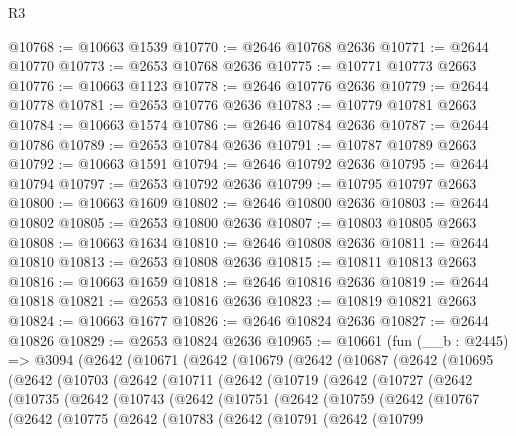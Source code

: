 \begin{lexlean}{R3}
\begin{coremodule}
@10768 := @10663 @1539
@10770 := @2646 @10768 @2636
@10771 := @2644 @10770
@10773 := @2653 @10768 @2636
@10775 := @10771 @10773 @2663
@10776 := @10663 @1123
@10778 := @2646 @10776 @2636
@10779 := @2644 @10778
@10781 := @2653 @10776 @2636
@10783 := @10779 @10781 @2663
@10784 := @10663 @1574
@10786 := @2646 @10784 @2636
@10787 := @2644 @10786
@10789 := @2653 @10784 @2636
@10791 := @10787 @10789 @2663
@10792 := @10663 @1591
@10794 := @2646 @10792 @2636
@10795 := @2644 @10794
@10797 := @2653 @10792 @2636
@10799 := @10795 @10797 @2663
@10800 := @10663 @1609
@10802 := @2646 @10800 @2636
@10803 := @2644 @10802
@10805 := @2653 @10800 @2636
@10807 := @10803 @10805 @2663
@10808 := @10663 @1634
@10810 := @2646 @10808 @2636
@10811 := @2644 @10810
@10813 := @2653 @10808 @2636
@10815 := @10811 @10813 @2663
@10816 := @10663 @1659
@10818 := @2646 @10816 @2636
@10819 := @2644 @10818
@10821 := @2653 @10816 @2636
@10823 := @10819 @10821 @2663
@10824 := @10663 @1677
@10826 := @2646 @10824 @2636
@10827 := @2644 @10826
@10829 := @2653 @10824 @2636
@10965 := @10661
    (fun (__b : @2445) =>
    @3094
      (@2642
        (@10671
          (@2642
            (@10679
              (@2642
                (@10687
                  (@2642
                    (@10695
                      (@2642
                        (@10703
                          (@2642
                            (@10711
                              (@2642
                                (@10719
                                  (@2642
                                    (@10727
                                      (@2642
                                        (@10735
                                          (@2642
                                            (@10743
                                              (@2642
                                                (@10751
                                                  (@2642
                                                    (@10759
                                                      (@2642
                                                        (@10767
                                                          (@2642
                                                            (@10775
                                                              (@2642
                                                                (@10783
                                                                  (@2642
                                                                    (@10791
                                                                      (@2642
                                                                        (@10799

\end{coremodule}
\end{lexlean}
